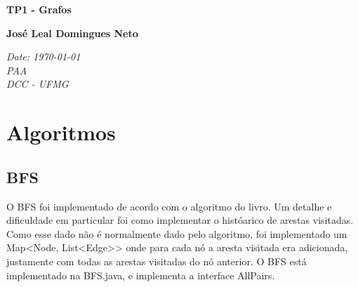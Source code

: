 \documentclass[a4paper,11pt,oneside]{article}
\begin{document}
  \thispagestyle{empty}

  \begin{flushleft}
    \textbf{\huge TP1 - Grafos}
  \end{flushleft}
  \vspace*{6mm}
  \begin{flushleft}
    \textbf{\large Jos\'e Leal Domingues Neto}\\[2ex]
  \end{flushleft}
  \vspace*{1mm}
  \begin{flushleft}
    \textit{
      Date: \today \\
      PAA \\
      DCC - UFMG}
  \end{flushleft}
  \vspace*{2mm}

\newpage

  \section{Algoritmos}
    \subsection{BFS}
    O BFS foi implementado de acordo com o algoritmo do livro. Um detalhe e dificuldade em particular foi como implementar o hist\'oarico de arestas visitadas. Como esse dado n\~ao \'e normalmente dado pelo algoritmo, foi implementado um Map{\textless}Node, List{\textless}Edge{\textgreater}{\textgreater} onde para cada n\'o a aresta visitada era adicionada, justamente com todas as arestas visitadas do n\'o anterior. O BFS est\'a implementado na BFS.java, e implementa a interface AllPairs.
    
\end{document}
